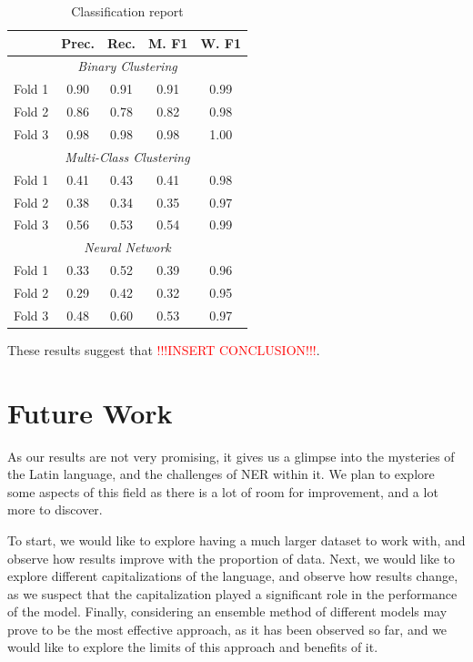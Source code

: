 \documentclass[11pt]{article}
\begin{document}
\begin{table}[H]
  \centering
  \begin{tabular}{|l|c|c|c|c|}
  \hline
  \textbf{} & \textbf{Prec.} & \textbf{Rec.} & \textbf{M. F1} & \textbf{W. F1} \\
  \hline
  \multicolumn{5}{|c|}{\textit{Binary Clustering}} \\
  \hline
  Fold 1   & 0.90 & 0.91 & 0.91 & 0.99 \\
  Fold 2   & 0.86 & 0.78 & 0.82 & 0.98 \\
  Fold 3   & 0.98 & 0.98 & 0.98 & 1.00 \\
  \hline
  \multicolumn{5}{|c|}{\textit{Multi-Class Clustering}} \\
  \hline
  Fold 1   & 0.41 & 0.43 & 0.41 & 0.98 \\
  Fold 2   & 0.38 & 0.34 & 0.35 & 0.97 \\
  Fold 3   & 0.56 & 0.53 & 0.54 & 0.99 \\
  \hline
  \multicolumn{5}{|c|}{\textit{Neural Network}} \\
  \hline
  Fold 1   & 0.33 & 0.52 & 0.39 & 0.96 \\
  Fold 2   & 0.29 & 0.42 & 0.32 & 0.95 \\
  Fold 3   & 0.48 & 0.60 & 0.53 & 0.97 \\
  \hline
  \end{tabular}
  \caption{Classification report}
  \label{tab:Classification-Report}
\end{table}

These results suggest that \textcolor{red}{!!!INSERT CONCLUSION!!!}.

\section{Future Work}

As our results are not very promising, it gives us a glimpse into the mysteries of the Latin language, and the challenges of NER within it.
We plan to explore some aspects of this field as there is a lot of room for improvement, and a lot more to discover.

To start, we would like to explore having a much larger dataset to work with, and observe how results improve with the proportion of data.
Next, we would like to explore different capitalizations of the language, and observe how results change, as we
suspect that the capitalization played a significant role in the performance of the model.
Finally, considering an ensemble method of different models may prove to be the most effective approach, as it has been observed so far,
and we would like to explore the limits of this approach and benefits of it.
\end{document}
